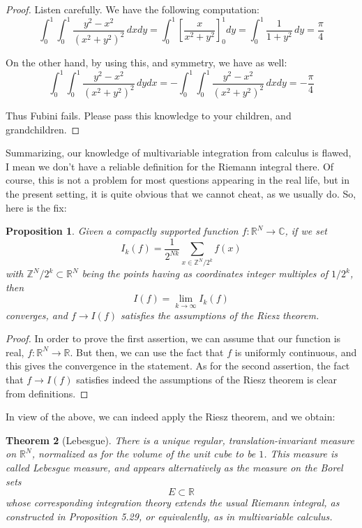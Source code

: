 \documentclass[12pt]{amsbook}
\newtheorem{theorem}{Theorem}[chapter]
\newtheorem{proposition}[theorem]{Proposition}
\begin{document}
\begin{proof}
Listen carefully. We have the following computation:
$$\int_0^1\int_0^1\frac{y^2-x^2}{(x^2+y^2)^2}\,dxdy
=\int_0^1\left[\frac{x}{x^2+y^2}\right]_0^1dy
=\int_0^1\frac{1}{1+y^2}\,dy
=\frac{\pi}{4}$$

On the other hand, by using this, and symmetry, we have as well:
$$\int_0^1\int_0^1\frac{y^2-x^2}{(x^2+y^2)^2}\,dydx
=-\int_0^1\int_0^1\frac{y^2-x^2}{(x^2+y^2)^2}\,dxdy
=-\frac{\pi}{4}$$

Thus Fubini fails. Please pass this knowledge to your children, and grandchildren.
\end{proof}

Summarizing, our knowledge of multivariable integration from calculus is flawed, I mean we don't have a reliable definition for the Riemann integral there. Of course, this is not a problem for most questions appearing in the real life, but in the present setting, it is quite obvious that we cannot cheat, as we usually do. So, here is the fix:

\begin{proposition}
Given a compactly supported function $f:\mathbb R^N\to\mathbb C$, if we set
$$I_k(f)=\frac{1}{2^{Nk}}\sum_{x\in\mathbb Z^N/2^k}f(x)$$
with $\mathbb Z^N/2^k\subset\mathbb R^N$ being the points having as coordinates integer multiples of $1/2^k$, then
$$I(f)=\lim_{k\to\infty}I_k(f)$$
converges, and $f\to I(f)$ satisfies the assumptions of the Riesz theorem.
\end{proposition}

\begin{proof}
In order to prove the first assertion, we can assume that our function is real, $f:\mathbb R^N\to\mathbb R$. But then, we can use the fact that $f$ is uniformly continuous, and this gives the convergence in the statement. As for the second assertion, the fact that $f\to I(f)$ satisfies indeed the assumptions of the Riesz theorem is clear from definitions.
\end{proof}

In view of the above, we can indeed apply the Riesz theorem, and we obtain:

\begin{theorem}[Lebesgue]
There is a unique regular, translation-invariant measure on $\mathbb R^N$, normalized as for the volume of the unit cube to be $1$. This measure is called Lebesgue measure, and appears alternatively as the measure on the Borel sets 
$$E\subset\mathbb R$$
whose corresponding integration theory extends the usual Riemann integral, as constructed in Proposition 5.29, or equivalently, as in multivariable calculus.
\end{theorem}
\end{document}

